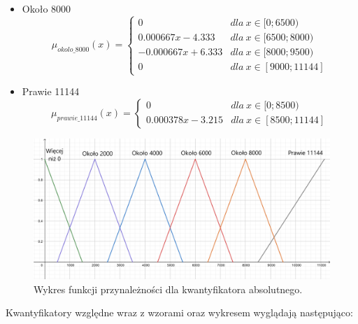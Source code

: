 \documentclass{classrep}
\begin{document}
\begin{itemize}
\begin{equation}
        \end{equation}
        \item Około 8000
        \begin{equation}
            \mu_{okolo\_8000}(x) = \left\{\begin{matrix} 0 & dla \: x\in [0;6500) \\ 0.000667x - 4.333 & dla \: x\in[6500;8000) \\ -0.000667x + 6.333 & dla \: x\in [8000; 9500) \\ 0 & dla \: x\in[9000; 11144] \end{matrix}\right.
        \end{equation}
        \item Prawie 11144
        \begin{equation}
            \mu_{prawie\_11144}(x) = \left\{\begin{matrix} 0 & dla \: x\in [0;8500) \\ 0.000378x - 3.215 & dla \: x\in [8500; 11144] \end{matrix}\right.
        \end{equation}
    \end{itemize}
\begin{figure}[H]
    \centering
    \includegraphics[width=14cm]{wykres_kwantyfikator_absolutny.png}
    \caption{Wykres funkcji przynależności dla kwantyfikatora absolutnego.}
    \label{rysunek:kwantyfikator_absolutny}
\end{figure}
Kwantyfikatory względne wraz z wzorami oraz wykresem wyglądają następująco:
\end{document}
